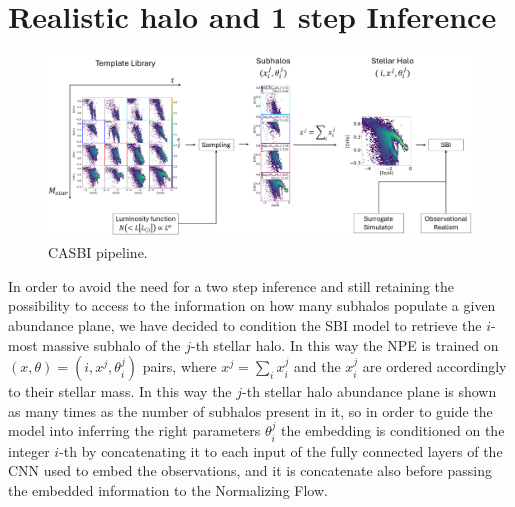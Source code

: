 
\section{Realistic halo and 1 step Inference}

\begin{figure}[ht]
    \centering
    \includegraphics[width=1\textwidth]{./figure/CASBI.png}
    \caption{CASBI pipeline.}
    \label{fig:CASBI}
\end{figure}

In order to avoid the need for a two step inference and still retaining the possibility to access to the information on how many subhalos populate a given abundance plane, we have decided to condition the SBI model to retrieve the $i$-most massive subhalo of the $j$-th stellar halo. In this way the NPE is trained on $(x, \theta) = (i, x^j, \theta_i^j)$ pairs, where $x^j = \sum_i x_i^j$ and the $x_i^j$ are ordered accordingly to their stellar mass. In this way the $j$-th stellar halo abundance plane is shown as many times as the number of subhalos present in it, so in order to guide the model into inferring the right parameters $\theta_i^j$ the embedding is conditioned on the integer $i$-th by concatenating it to each input of the fully connected layers of the CNN used to embed the observations, and it is concatenate also before passing the embedded information to the Normalizing Flow. 

